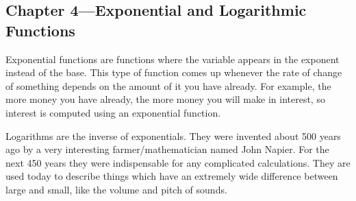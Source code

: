 \documentclass[fleqn, onecolumn]{article}
\begin{document}
\subsection{Chapter 4---Exponential and Logarithmic Functions}

Exponential functions are functions where the variable appears in the exponent instead of the base.  This type of
function comes up whenever the rate of change of something depends on the amount of it you have already.  For example,
the more money you have already, the more money you will make in interest, so interest is computed using an exponential
function.

Logarithms are the inverse of exponentials.  They were invented about 500 years ago by a very interesting
farmer/mathematician named John Napier.  For the next 450 years they were indispensable for any complicated
calculations.  They are used today to describe things which have an extremely wide difference between large and small,
like the volume and pitch of sounds.
\end{document}
